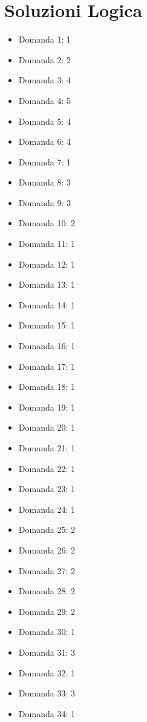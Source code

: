 \documentclass[20pt, a4paper]{article}
\begin{document}
\newpage
\section*{Soluzioni Logica}
\begin{itemize}[leftmargin=*]
\item [Logica] Domanda 1: 1
\item [Logica] Domanda 2: 2
\item [Logica] Domanda 3: 4
\item [Logica] Domanda 4: 5
\item [Logica] Domanda 5: 4
\item [Logica] Domanda 6: 4
\item [Logica] Domanda 7: 1
\item [Logica] Domanda 8: 3
\item [Logica] Domanda 9: 3
\item [Logica] Domanda 10: 2
\item [Logica] Domanda 11: 1
\item [Logica] Domanda 12: 1
\item [Logica] Domanda 13: 1
\item [Logica] Domanda 14: 1
\item [Logica] Domanda 15: 1
\item [Logica] Domanda 16: 1
\item [Logica] Domanda 17: 1
\item [Logica] Domanda 18: 1
\item [Logica] Domanda 19: 1
\item [Logica] Domanda 20: 1
\item [Logica] Domanda 21: 1
\item [Logica] Domanda 22: 1
\item [Logica] Domanda 23: 1
\item [Logica] Domanda 24: 1
\item [Logica] Domanda 25: 2
\item [Logica] Domanda 26: 2
\item [Logica] Domanda 27: 2
\item [Logica] Domanda 28: 2
\item [Logica] Domanda 29: 2
\item [Logica] Domanda 30: 1
\item [Logica] Domanda 31: 3
\item [Logica] Domanda 32: 1
\item [Logica] Domanda 33: 3
\item [Logica] Domanda 34: 1

\end{itemize}
\end{document}

